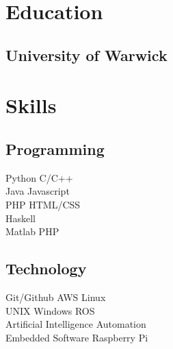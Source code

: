\documentclass{deedy-resume-reversed}
\begin{document}
\begin{minipage}[t]{0.60\textwidth}

% 
% 

%
%

\end{minipage}
\hfill
\begin{minipage}[t]{0.33\textwidth}


\section{Education}

\subsection{University of Warwick}
\sectionsep


\section{Skills}
\subsection{Programming}
Python \textbullet{} C/C++ \\ Java \textbullet{} Javascript\\
PHP \textbullet{} HTML/CSS \\ Haskell \\
Matlab \textbullet{} PHP \\
\sectionsep

\subsection{Technology}
Git/Github \textbullet{} AWS \textbullet{} Linux \\
UNIX \textbullet{} Windows \textbullet{} ROS \\
Artificial Intelligence \textbullet{} Automation \\
Embedded Software \textbullet{} Raspberry Pi \\
\sectionsep


\end{minipage}
\end{document}
